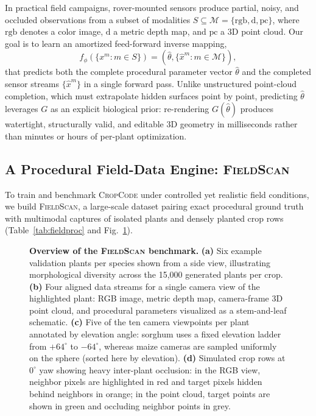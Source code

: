 \documentclass[10pt,twocolumn,letterpaper]{article}
\newcommand{\method}{\textsc{CropCode}}
\newcommand{\dataset}{\textsc{FieldScan}}
\begin{document}
In practical field campaigns, rover-mounted sensors produce partial, noisy, and occluded observations from a subset of modalities $S \subseteq \mathcal{M} = \{\mathrm{rgb}, \mathrm{d}, \mathrm{pc}\}$, where $\mathrm{rgb}$ denotes a color image, $\mathrm{d}$ a metric depth map, and $\mathrm{pc}$ a 3D point cloud. Our goal is to learn an amortized feed-forward inverse mapping,
\begin{equation}
  f_\phi\!\left(\{x^m : m \in S\}\right)
  = \left(\hat\theta, \{\hat x^m : m \in \mathcal{M}\}\right),
  \label{eq:procedural-inverse}
\end{equation}
that predicts both the complete procedural parameter vector $\hat\theta$ and the completed sensor streams $\{\hat x^m\}$ in a single forward pass. Unlike unstructured point-cloud completion, which must extrapolate hidden surfaces point by point, predicting $\hat\theta$ leverages $G$ as an explicit biological prior: re-rendering $G(\hat\theta)$ produces watertight, structurally valid, and editable 3D geometry in milliseconds rather than minutes or hours of per-plant optimization.

\subsection{A Procedural Field-Data Engine: \dataset{}}
\label{sec:method-data}

To train and benchmark \method{} under controlled yet realistic field conditions, we build \dataset{}, a large-scale dataset pairing exact procedural ground truth with multimodal captures of isolated plants and densely planted crop rows (Table~\ref{tab:fieldproc} and Fig.~\ref{fig:dataset}).

\begin{figure}[t]
  \centering
  \resizebox{\linewidth}{!}{}
  \caption{\textbf{Overview of the \dataset{} benchmark.} \textbf{(a)} Six example validation plants per species shown from a side view, illustrating morphological diversity across the 15{,}000 generated plants per crop. \textbf{(b)} Four aligned data streams for a single camera view of the highlighted plant: RGB image, metric depth map, camera-frame 3D point cloud, and procedural parameters visualized as a stem-and-leaf schematic. \textbf{(c)} Five of the ten camera viewpoints per plant annotated by elevation angle: sorghum uses a fixed elevation ladder from $+64^\circ$ to $-64^\circ$, whereas maize cameras are sampled uniformly on the sphere (sorted here by elevation). \textbf{(d)} Simulated crop rows at $0^\circ$ yaw showing heavy inter-plant occlusion: in the RGB view, neighbor pixels are highlighted in red and target pixels hidden behind neighbors in orange; in the point cloud, target points are shown in green and occluding neighbor points in grey.}
  \label{fig:dataset}
\end{figure}
\end{document}
